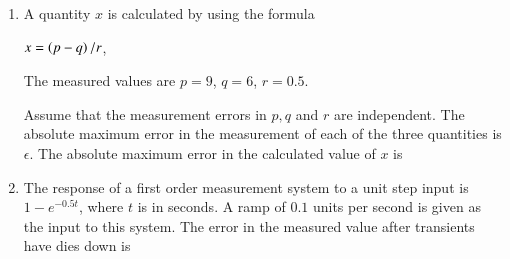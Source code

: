 \documentclass[journal,12pt,onecolumn]{IEEEtran}
\theoremstyle{remark}
\begin{document}
\begin{enumerate}
 
\item A quantity $x$ is calculated by using the formula\par
$x=\left(p-q\right)/r$,\par
The measured values are $p=9$, $q=6$, $r=0.5$.\par
Assume that the measurement errors in $p,q$ and $r$ are independent. The absolute maximum error in the measurement of each of the three quantities is $\epsilon$. The absolute maximum error in the calculated value of $x$ is \par \hfill{}
\begin{enumerate}
\end{enumerate}

 
\item The response of a first order measurement system to a unit step input is $1-e^{-0.5t}$, where $t$ is in seconds. A ramp of $0.1$ units per second is given as the input to this system. The error in the measured value after transients have dies down is \par \hfill{}
\begin{enumerate}
\end{enumerate}


\end{enumerate}
\end{document}
